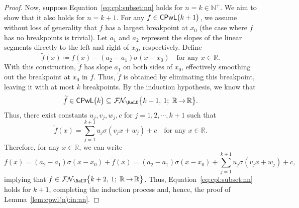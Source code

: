 \documentclass[11pt,a4paper]{article}
\let\dots\cdots
\begin{document}
\begin{proof}
Now, suppose Equation~\eqref{eq:cpl:subset:nn} holds for \( n = k \in \mathbb{N}^+ \). We aim to show that it also holds for \( n = k + 1 \).
For any \( f \in \cpl\big(k+1\big) \), we assume without loss of generality that \( f \) has a largest breakpoint at \( x_0 \) (the case where \( f \) has no breakpoints is trivial). 
Let \( a_1 \) and \( a_2 \) represent the slopes of the linear segments directly to the left and right of \( x_0 \), respectively. Define
\[
\tilde{f}(x) \coloneqq f(x) - (a_2 - a_1) \sigma(x - x_0) \quad \text{for any } x \in \mathbb{R}.
\]
With this construction, \( \tilde{f} \) has slope \( a_1 \) on both sides of \( x_0 \), effectively smoothing out the breakpoint at \( x_0 \) in \( f \). Thus, \( \tilde{f} \) is obtained by eliminating this breakpoint, leaving it with at most \( k \) breakpoints.
By the induction hypothesis, we know that
\[
\tilde{f} \in \cpl\big(k\big) \subseteq \nn[\big]{\ReLU}{k+1}{1}{\mathbb{R}}{\mathbb{R}}.
\]
Thus, there exist constants \( u_j,v_j,w_j,c \) for \( j = 1, 2, \dots, k+1 \) such that
\[
\tilde{f}(x) = \sum_{j=1}^{k+1} u_{j} \sigma(v_{j} x + w_{j}) + c \quad \text{for any } x \in \mathbb{R}.
\]
Therefore, for any \( x \in \mathbb{R} \), we can write
\begin{equation*}
    f(x) = (a_2 - a_1) \sigma(x - x_0) + \tilde{f}(x) = (a_2 - a_1) \sigma(x - x_0) + \sum_{j=1}^{k+1} u_{j} \sigma(v_{j} x + w_{j}) + c,
\end{equation*}
implying that \( f \in \nn[\big]{\ReLU}{k+2}{1}{\mathbb{R}}{\mathbb{R}} \).
Thus, Equation~\eqref{eq:cpl:subset:nn} holds for \( k + 1 \), completing the induction process and, hence, the proof of Lemma~\ref{lem:cpwl(n):in:nn}.
\end{proof}
\end{document}
